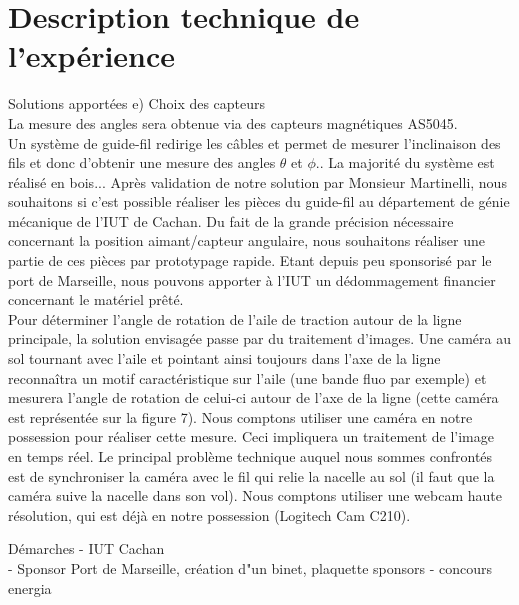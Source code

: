 \documentclass[a4paper,twoside,12pt]{article}
\newcounter{partie}
\newcounter{sous-partie}
\newenvironment{partie}[1]
{
\section{#1}
}
{

}
\newenvironment{sous-partie}[1]
{
\subsection{#1}
}
{

}
\begin{document}
\begin{partie}{Description technique de l'expérience}
\begin{sous-partie}{Solutions apportées}
e) Choix des capteurs\\
La mesure des angles sera obtenue via des capteurs magnétiques AS5045.\\
Un système de guide-fil redirige les câbles et permet de mesurer l'inclinaison des fils et donc d'obtenir une mesure des angles $\theta$ et $\phi.$. %
La majorité du système est réalisé en bois...
Après validation de notre solution par Monsieur Martinelli, nous souhaitons si c'est possible réaliser les pièces du guide-fil au département de génie mécanique de l'IUT de Cachan. %
Du fait de la grande précision nécessaire concernant la position aimant/capteur angulaire, nous souhaitons réaliser une partie de ces pièces par prototypage rapide. %
Etant depuis peu sponsorisé par le port de Marseille, nous pouvons apporter à l'IUT un dédommagement financier concernant le matériel prêté.\\
Pour déterminer l'angle de rotation de l'aile de traction autour de la ligne principale, la solution envisagée passe par du traitement d'images. %
Une caméra au sol tournant avec l'aile et pointant ainsi toujours dans l'axe de la ligne reconnaîtra un motif caractéristique sur l'aile (une bande fluo par exemple) et mesurera l'angle de rotation de celui-ci autour de l'axe de la ligne (cette caméra est représentée sur la figure 7). %
Nous comptons utiliser une caméra en notre possession pour réaliser cette mesure. %
Ceci impliquera un traitement de l'image en temps réel. %
Le principal problème technique auquel nous sommes confrontés est de synchroniser la caméra avec le fil qui relie la nacelle au sol (il faut que la caméra suive la nacelle dans son vol). %
Nous comptons utiliser une webcam haute résolution, qui est déjà en notre possession (Logitech Cam C210).

\end{sous-partie}

\begin{sous-partie}{Démarches}
- IUT Cachan\\
- Sponsor Port de Marseille, création d"un binet, plaquette sponsors - concours energia\\
\end{sous-partie}




\end{partie}

\newpage
\end{document}
